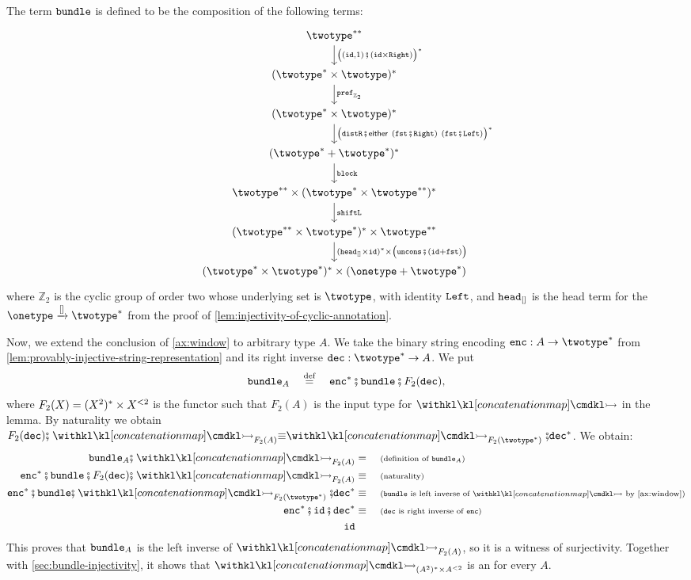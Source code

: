 \begin{definition}\label{def:bundle-term}
    The term $\bundleterm$ is defined to be the composition of the following terms:
    \[
    \begin{tikzcd}
        \twotype^{**}
        \ar[d,"{\big(\appendoneterm \comp (\idterm \times \rightterm)\big)^*}"]\\
        (\twotype^* \times \twotype)^*
        \ar[d,"\prefterm_{\mathbb{Z}_2}"]\\
        (\twotype^* \times \twotype)^*
        \ar[d,"{\big(\distrterm \comp \either{(\fstterm \comp \rightterm)}{(\fstterm \comp \leftterm)}\big)^*}"]\\
        (\twotype^* + \twotype^*)^*
        \ar[d,"\blockterm"]\\
        \twotype^{**} \times (\twotype^* \times \twotype^{**})^*
        \ar[d,"\shiftlterm"]\\
        (\twotype^{**} \times \twotype^*)^* \times \twotype^{**}
        \ar[d,"{(\headterm_{[]} \times \idterm)^* \times \big(\unconsterm \comp (\idterm + \fstterm)\big)}"]\\
        (\twotype^* \times \twotype^*)^* \times (\onetype + \twotype^*)
    \end{tikzcd}
    \]
    where $\mathbb{Z}_2$ is the cyclic group of order two whose underlying set is $\twotype$, with identity $\leftterm$, and $\headterm_{[]}$ is the head term for the  $\onetype \xrightarrow{[]} \twotype^*$ from the proof of \cref{lem:injectivity-of-cyclic-annotation}.
\end{definition}

Now, we extend the conclusion of \cref{ax:window} to arbitrary type $A$. We take the binary string encoding $\encterm: A \to \twotype^*$ from \cref{lem:provably-injective-string-representation} and its right inverse $\decterm: \twotype^* \to A$. We put 
\[
\bundleterm_A \quad \eqdef \quad \encterm^* \comp \bundleterm \comp F_2(\decterm),
\]
where $F_2(X) = \bundle[X]{2}$ is the functor such that $F_2(A)$ is the input type for $\concmap$ in the lemma.
By naturality we obtain $F_2(\decterm)\comp \concmap_{F_2(A)} \equiv \concmap_{F_2(\twotype^*)} \comp \decterm^*$. We obtain:
\begin{align*}
    \bundleterm_A \comp \concmap_{F_2(A)} &= \why{definition of $\bundleterm_A$} \\
    \encterm^* \comp \bundleterm \comp F_2(\decterm) \comp \concmap_{F_2(A)} & \equiv \why{naturality} \\
    \encterm^* \comp \bundleterm \comp \concmap_{F_2(\twotype^*)} \comp \decterm^* & \equiv \why{$\bundleterm$ is left inverse of $\concmap$ by \cref{ax:window}} \\
    \encterm^* \comp \idterm \comp \decterm^* & \equiv \why{$\decterm$ is right inverse of $\encterm$} \\
    \idterm
\end{align*}
This proves that $\bundleterm_A$ is the left inverse of $\concmap_{F_2(A)}$, so it is a witness of surjectivity.
Together with \cref{sec:bundle-injectivity}, it shows that $\concmap_{\bundle{2}}$ is an  for every $A$.

